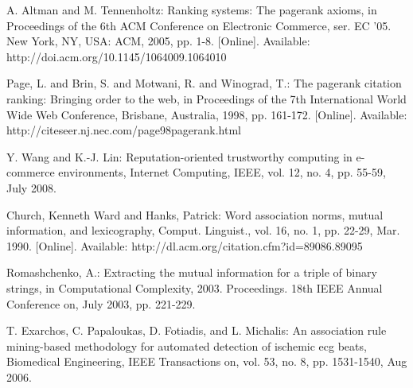 \documentclass{llncs}
\begin{document}
\begin{thebibliography}{15}
A. Altman and M. Tennenholtz: Ranking systems: The pagerank axioms, in Proceedings of the 6th ACM Conference on Electronic Commerce, ser. EC '05. New York, NY, USA: ACM, 2005, pp. 1-8.
[Online]. Available: http://doi.acm.org/10.1145/1064009.1064010



 Page, L. and Brin, S. and Motwani, R. and Winograd, T.: The pagerank citation ranking: Bringing order to the web, in Proceedings of the 7th International World Wide Web Conference, Brisbane, Australia, 1998, pp. 161-172. [Online]. Available: http://citeseer.nj.nec.com/page98pagerank.html

Y. Wang and K.-J. Lin: Reputation-oriented trustworthy computing in e-commerce environments, Internet Computing, IEEE, vol. 12, no. 4, pp. 55-59, July 2008.

 Church, Kenneth Ward and Hanks, Patrick: Word association norms, mutual information, and lexicography, Comput. Linguist., vol. 16, no. 1, pp. 22-29, Mar. 1990. [Online]. Available: http://dl.acm.org/citation.cfm?id=89086.89095

 Romashchenko, A.: Extracting the mutual information for a triple of binary strings, in Computational Complexity, 2003. Proceedings. 18th IEEE Annual Conference on, July 2003, pp. 221-229.

T. Exarchos, C. Papaloukas, D. Fotiadis, and L. Michalis: An association rule mining-based methodology for automated detection of ischemic ecg beats, Biomedical Engineering, IEEE Transactions on, vol. 53, no. 8, pp. 1531-1540, Aug 2006.


\end{thebibliography}
\end{document}
